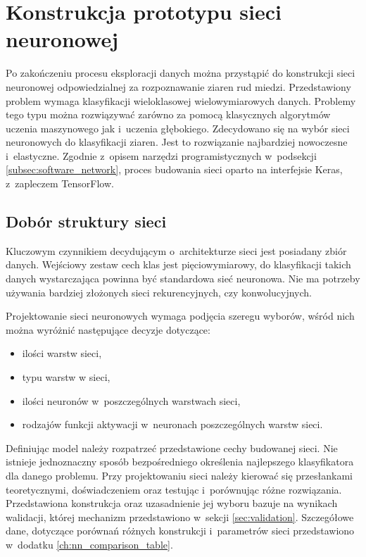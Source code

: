 \section{Konstrukcja prototypu sieci neuronowej}
Po zakończeniu procesu eksploracji danych można przystąpić do
konstrukcji sieci neuronowej odpowiedzialnej za rozpoznawanie ziaren rud
miedzi.
Przedstawiony problem wymaga klasyfikacji wieloklasowej wielowymiarowych
danych.
Problemy tego typu można rozwiązywać zarówno za pomocą klasycznych algorytmów
uczenia maszynowego jak i~uczenia głębokiego.
Zdecydowano się na wybór sieci neuronowych do klasyfikacji ziaren.
Jest to rozwiązanie najbardziej nowoczesne i~elastyczne.
Zgodnie z~opisem narzędzi programistycznych w~podsekcji
\ref{subsec:software_network}, proces budowania sieci oparto na interfejsie
Keras, z~zapleczem TensorFlow.

\subsection{Dobór struktury sieci} \label{subsec:nnbuild}
Kluczowym czynnikiem decydującym o~architekturze sieci jest posiadany
zbiór danych.
Wejściowy zestaw cech klas jest pięciowymiarowy, do klasyfikacji takich
danych wystarczająca powinna być standardowa sieć neuronowa.
Nie ma potrzeby używania bardziej złożonych sieci rekurencyjnych, czy
konwolucyjnych.

Projektowanie sieci neuronowych wymaga podjęcia szeregu wyborów, wśród nich
można wyróżnić następujące decyzje dotyczące:
\begin{itemize}
	\item ilości warstw sieci,
	\item typu warstw w sieci,
	\item ilości neuronów w~poszczególnych warstwach sieci,
	\item rodzajów funkcji aktywacji w~neuronach poszczególnych warstw sieci.
\end{itemize}
Definiując model należy rozpatrzeć przedstawione cechy budowanej sieci.
Nie istnieje jednoznaczny sposób bezpośredniego określenia najlepszego
klasyfikatora dla danego problemu.
Przy projektowaniu sieci należy kierować się przesłankami teoretycznymi,
doświadczeniem oraz testując i~porównując różne rozwiązania.
Przedstawiona konstrukcja oraz uzasadnienie jej wyboru bazuje na wynikach
walidacji, której mechanizm przedstawiono w~sekcji \ref{sec:validation}.
Szczegółowe dane, dotyczące porównań różnych konstrukcji i~parametrów
sieci przedstawiono w~dodatku \ref{ch:nn_comparison_table}.


